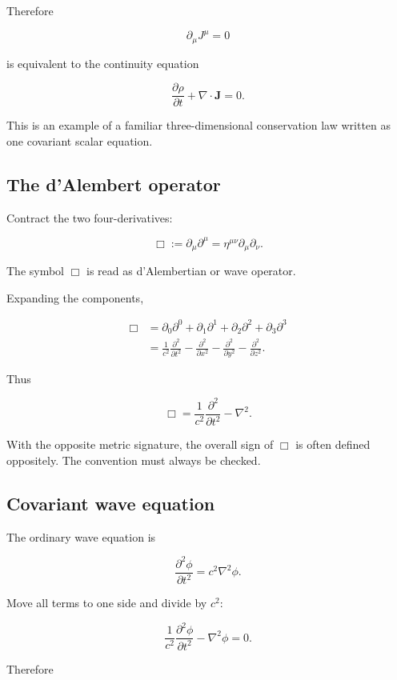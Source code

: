 Therefore

\[
\boxed{
\partial_{\mu}J^{\mu}=0
}
\]

is equivalent to the continuity equation

\[
\boxed{
\frac{\partial\rho}{\partial t}
+
\nabla\cdot\mathbf{J}
=0
}.
\]

This is an example of a familiar three-dimensional conservation law written as one covariant scalar equation.

\subsection{The d'Alembert operator}

Contract the two four-derivatives:

\[
\boxed{
\Box
:=
\partial_{\mu}\partial^{\mu}
=
\eta^{\mu\nu}
\partial_{\mu}\partial_{\nu}
}.
\]

The symbol \(\Box\) is read as d'Alembertian or wave operator.

Expanding the components,

\[
\begin{aligned}
\Box
&=
\partial_{0}\partial^{0}
+
\partial_{1}\partial^{1}
+
\partial_{2}\partial^{2}
+
\partial_{3}\partial^{3}\\
&=
\frac{1}{c^{2}}
\frac{\partial^{2}}{\partial t^{2}}
-
\frac{\partial^{2}}{\partial x^{2}}
-
\frac{\partial^{2}}{\partial y^{2}}
-
\frac{\partial^{2}}{\partial z^{2}}.
\end{aligned}
\]

Thus

\[
\boxed{
\Box
=
\frac{1}{c^{2}}
\frac{\partial^{2}}{\partial t^{2}}
-
\nabla^{2}
}.
\]

With the opposite metric signature, the overall sign of \(\Box\) is often defined oppositely. The convention must always be checked.

\subsection{Covariant wave equation}

The ordinary wave equation is

\[
\frac{\partial^{2}\phi}{\partial t^{2}}
=
c^{2}\nabla^{2}\phi.
\]

Move all terms to one side and divide by \(c^{2}\):

\[
\frac{1}{c^{2}}
\frac{\partial^{2}\phi}{\partial t^{2}}
-
\nabla^{2}\phi
=0.
\]

Therefore

